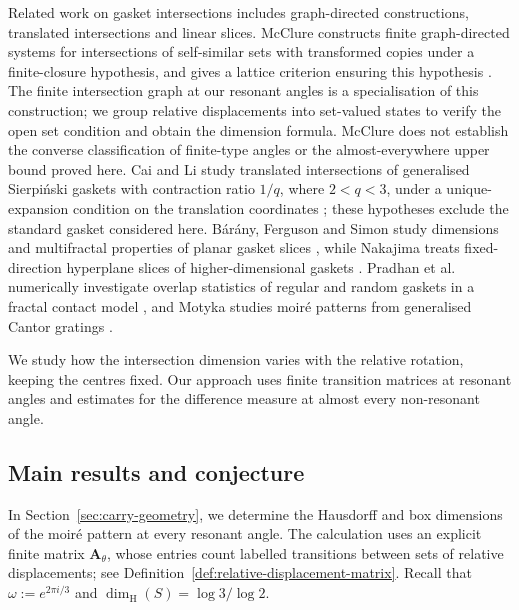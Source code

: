 \documentclass[scheme=plain]{ctexart}
\newcommand{\dimhaus}{\dim_\mathrm{H}}
\begin{document}

Related work on gasket intersections includes graph-directed constructions, translated intersections and linear slices.
McClure constructs finite graph-directed systems for intersections of self-similar sets with transformed copies under a finite-closure hypothesis, and gives a lattice criterion ensuring this hypothesis \cite[Theorem~1 and Lemma~2]{McClure2008}.
The finite intersection graph at our resonant angles is a specialisation of this construction; we group relative displacements into set-valued states to verify the open set condition and obtain the dimension formula.
McClure does not establish the converse classification of finite-type angles or the almost-everywhere upper bound proved here.
Cai and Li study translated intersections of generalised Sierpi\'nski gaskets with contraction ratio $1/q$, where $2<q<3$, under a unique-expansion condition on the translation coordinates \cite{CaiLi2020}; these hypotheses exclude the standard gasket considered here.
B\'ar\'any, Ferguson and Simon study dimensions and multifractal properties of planar gasket slices \cite{BaranyFergusonSimon2012}, while Nakajima treats fixed-direction hyperplane slices of higher-dimensional gaskets \cite{Nakajima2022}.
Pradhan et al. numerically investigate overlap statistics of regular and random gaskets in a fractal contact model \cite{PradhanEtAl2003}, and Motyka studies moir\'e patterns from generalised Cantor gratings \cite{Motyka2021}.


We study how the intersection dimension varies with the relative rotation, keeping the centres fixed. Our approach uses finite transition matrices at resonant angles and estimates for the difference measure at almost every non-resonant angle.


\subsection{Main results and conjecture}

In Section~\ref{sec:carry-geometry}, we determine the Hausdorff and box dimensions of the moir\'e pattern at every resonant angle.
The calculation uses an explicit finite matrix $\mathbf A_\theta$, whose entries count labelled transitions between sets of relative displacements; see Definition~\ref{def:relative-displacement-matrix}.
Recall that $\omega:=e^{2\pi i/3}$ and $\dimhaus(S)=\log3/\log2$.
\end{document}
